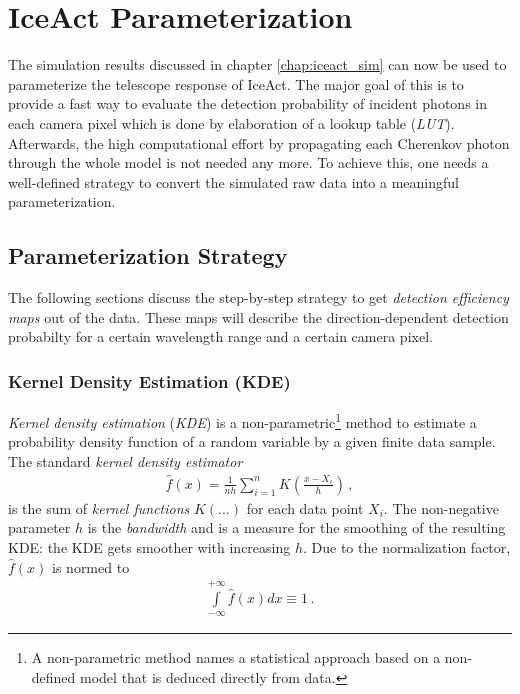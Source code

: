 \chapter{IceAct Parameterization}

The simulation results discussed in chapter \ref{chap:iceact_sim} can now be used to parameterize the telescope response of IceAct. The major goal of this is to provide a fast way to evaluate the detection probability of incident photons in each camera pixel which is done by elaboration of a lookup table (\textit{LUT}). Afterwards, the high computational effort by propagating each Cherenkov photon through the whole \geant model is not needed any more. To achieve this, one needs a well-defined strategy to convert the simulated raw data into a meaningful parameterization. 

\section{Parameterization Strategy}\label{sec:param:strategy}

The following sections discuss the step-by-step strategy to get \textit{detection efficiency maps} out of the \geant data. These maps will describe the direction-dependent detection probabilty for a certain wavelength range and a certain camera pixel.

\subsection{Kernel Density Estimation (KDE)}

\textit{Kernel density estimation} (\textit{KDE}) is a non-parametric\footnote{A non-parametric method names a statistical approach based on a non-defined model that is deduced directly from data.} method to estimate a probability density function of a random variable by a given finite data sample. The standard \textit{kernel density estimator}
\begin{align}
	\hat{f}(x)=\frac{1}{nh}\sum_{i=1}^{n}K\left(\frac{x-X_i}{h}\right)\,,
	\label{eq:kde}
\end{align}
is the sum of \textit{kernel functions} $K(\dots)$ for each data point $X_i$. The non-negative parameter $h$ is the \textit{bandwidth} and is a measure for the smoothing of the resulting KDE: the KDE gets smoother with increasing $h$. Due to the normalization factor, $\hat{f}(x)$ is normed to
\begin{align}
	\int\limits_{-\infty}^{+\infty}\hat{f}(x)dx \equiv 1\,.
	\label{kde:norm}
\end{align}

